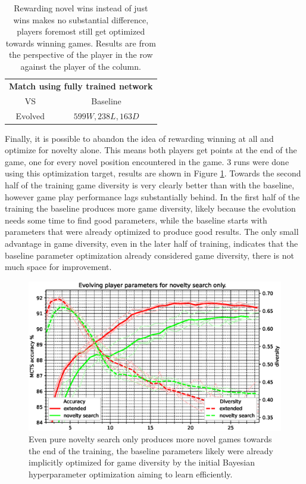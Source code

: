 \documentclass[12pt,onecolumn,oneside,titlepage]{article}
\begin{document}
\begin{table} [H]
 \centering

  \begin{tabular}{ c c }
  \multicolumn{2}{c}{\textbf{Match using fully trained network}} \\
	      VS & Baseline  \\
  \hline
  Evolved & $599W, 238L, 163D$
  \end{tabular}
  
  \caption{Rewarding novel wins instead of just wins makes no substantial difference, players foremost still get optimized towards winning games. Results are from the perspective of the player in the row against the player of the column.}
  \label{t:novel_win_fail}
\end{table}

Finally, it is possible to abandon the idea of rewarding winning at all and optimize for novelty alone. This means both players get points at the end of the game, one for every novel position encountered in the game. $3$ runs were done using this optimization target,
results are shown in Figure \ref{fig:pure_novelty_search}. Towards the second half of the training game diversity is very clearly better than with the baseline, however game play performance lags substantially behind.
In the first half of the training the baseline produces more game diversity, likely because the evolution needs some time to find good parameters, while the baseline starts with parameters that were already optimized to produce good results.
The only small advantage in game diversity, even in the later half of training, indicates that the baseline parameter optimization already considered game diversity, there is not much space for improvement.

\begin{figure}[H]
\centering
\includegraphics[clip,width=\columnwidth]{pure_novelty_search}
\caption{Even pure novelty search only produces more novel games towards the end of the training, the baseline parameters likely were already implicitly optimized for game diversity by the initial Bayesian hyperparameter optimization aiming to learn efficiently.}
\label{fig:pure_novelty_search}
\end{figure}
\end{document}
